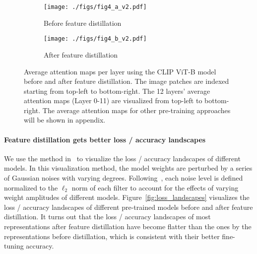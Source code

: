 \documentclass{article}
\begin{document}
\begin{figure}
\centering
\begin{subfigure}{.5\textwidth}
  \centering
  \texttt{[image: ./figs/fig4\_a\_v2.pdf]}
  \caption{Before feature distillation}
  \label{fig:att_patterns_a}
\end{subfigure}\begin{subfigure}{.5\textwidth}
  \centering
  \texttt{[image: ./figs/fig4\_b\_v2.pdf]}
  \caption{After feature distillation}
  \label{fig:att_patterns_b}
\end{subfigure}
    \caption{Average attention maps per layer using the CLIP ViT-B model before and after feature distillation. The image patches are indexed starting from top-left to bottom-right. The 12 layers' average attention maps (Layer 0-11) are visualized from top-left to bottom-right. The average attention maps for other pre-training approaches will be shown in appendix.}
    \label{fig:att_patterns}
\end{figure}

\paragraph{Feature distillation gets better loss / accuracy landscapes} We use the method in~\cite{losslandscape2017} to visualize the loss / accuracy landscapes of different models. In this visualization method, the model weights are perturbed by a series of Gaussian noises with varying degrees. Following~\cite{losslandscape2017}, each noise level is defined normalized to the $\ell_2$ norm of each filter to account for the effects of varying weight amplitudes of different models. Figure~\ref{fig:loss_landscapes} visualizes the loss / accuracy landscapes of different pre-trained models before and after feature distillation. It turns out that the loss / accuracy landscapes of most representations after feature distillation have become flatter than the ones by the representations before distillation, which is consistent with their better fine-tuning accuracy. 
\end{document}
